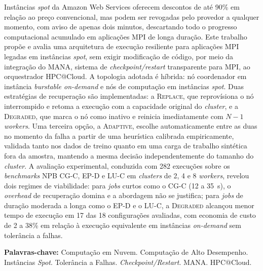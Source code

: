 \begin{resumo}[Resumo]
Instâncias \textit{spot} da Amazon Web Services oferecem descontos de até 90\%
em relação ao preço convencional, mas podem ser revogadas pelo provedor a
qualquer momento, com aviso de apenas dois minutos, descartando todo o progresso
computacional acumulado em aplicações MPI de longa duração. Este trabalho propõe
e avalia uma arquitetura de execução resiliente para aplicações MPI legadas em
instâncias \textit{spot}, sem exigir modificação de código, por meio da
integração do MANA, sistema de \textit{checkpoint/restart} transparente para MPI,
ao orquestrador HPC@Cloud. A topologia adotada é híbrida: nó coordenador em
instância \textit{burstable on-demand} e nós de computação em instâncias
\textit{spot}.
Duas estratégias de recuperação são implementadas: a
\textsc{Replace}, que reprovísiona o nó interrompido e retoma a execução com a
capacidade original do \textit{cluster}, e a \textsc{Degraded}, que marca o nó
como inativo e reinicia imediatamente com $N{-}1$ \textit{workers}. Uma terceira
opção, a \textsc{Adaptive}, escolhe automaticamente entre as duas no momento da
falha a partir de uma heurística calibrada empiricamente, validada tanto nos
dados de treino quanto em uma carga de trabalho sintética fora da amostra,
mantendo a mesma decisão independentemente do tamanho do \textit{cluster}. A
avaliação
experimental, conduzida com 282 execuções sobre os \textit{benchmarks} NPB
CG-C, EP-D e LU-C em \textit{clusters} de 2, 4 e 8 \textit{workers}, revelou
dois regimes de viabilidade: para \textit{jobs} curtos como o CG-C (12 a 35~s),
o \textit{overhead} de recuperação domina e a abordagem não se justifica; para
\textit{jobs} de duração moderada a longa como o EP-D e o LU-C, a
\textsc{Degraded} alcançou menor tempo de execução em 17 das 18 configurações
avaliadas, com economia de custo de 2 a 38\% em relação à execução equivalente
em instâncias \textit{on-demand} sem tolerância a falhas.

\vspace{\baselineskip}
\textbf{Palavras-chave:} Computação em Nuvem. Computação de Alto Desempenho.
Instâncias \textit{Spot}. Tolerância a Falhas. \textit{Checkpoint/Restart}.
MANA. HPC@Cloud.
\end{resumo}


